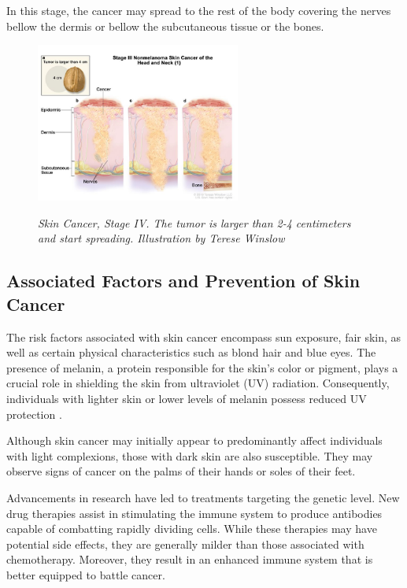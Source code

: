 \begin{itemize}
    In this stage, the cancer may spread to the rest of the body covering the
    nerves bellow the dermis or bellow the subcutaneous tissue or the bones.

    \begin{figure}[H] \centering
      \includegraphics[width=0.6\textwidth]{imatges/problem_domain/stage3-skin-cancer.jpg}
      \caption[Skin Cancer, Stage IV]{\textit{Skin Cancer, Stage IV. The tumor
      is larger than 2-4 centimeters and start spreading. Illustration by
    Terese Winslow}} {\label{fig:stage3-skin-canceer}} \end{figure}

\end{itemize}

\newpage

\subsection{Associated Factors and Prevention of Skin Cancer}

The risk factors associated with skin cancer encompass sun exposure, fair skin,
as well as certain physical characteristics such as blond hair and blue eyes.
The presence of melanin, a protein responsible for the skin's color or pigment,
plays a crucial role in shielding the skin from ultraviolet (UV) radiation.
Consequently, individuals with lighter skin or lower levels of melanin possess
reduced UV protection \cite{OrigenAndTreatment}. \newline

Although skin cancer may initially appear to predominantly affect individuals
with light complexions, those with dark skin are also susceptible. They may
observe signs of cancer on the palms of their hands or soles of their feet.
\newline

Advancements in research have led to treatments targeting the genetic level.
New drug therapies assist in stimulating the immune system to produce
antibodies capable of combatting rapidly dividing cells. While these therapies
may have potential side effects, they are generally milder than those
associated with chemotherapy. Moreover, they result in an enhanced immune
system that is better equipped to battle cancer. \newline


